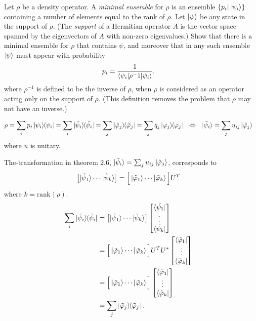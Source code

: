   Let $\rho$ be a density operator.  A \textit{minimal ensemble} for $\rho$ is an ensemble $\{p_i|\ket{\psi_i}\}$ containing a number of elements equal to the rank of $\rho$.  Let $\ket{\psi}$ be any state in the support of $\rho$.  (The \textit{support} of a Hermitian operator $A$ is the vector space spanned by the eigenvectors of $A$ with non-zero eigenvalues.)  Show that there is a minimal ensemble for $\rho$ that contains $\psi$, and moreover that in any such ensemble $\ket{\psi}$ must appear with probability $$p_i=\frac{1}{\braket{\psi_i|\rho^-1|\psi_i}},$$ where $\rho^{-1}$ is defined to be the inverse of $\rho$, when $\rho$ is considered as an operator acting only on the support of $\rho$.  (This definition removes the problem that $\rho$ may not have an inverse.)
\Soln
\begin{screen}
%
    \begin{align*}
        \rho = \sum_i p_i \ket{\psi_i}\hspace{-1mm} \bra{\psi_i}
            = \sum_i \ket{\tilde{\psi_i}}\hspace{-1mm} \bra{\tilde{\psi_i}}
            = \sum_j \ket{\tilde{\varphi}_j}\hspace{-1mm} \bra{\tilde{\varphi}_j}
            = \sum_j q_j \ket{\varphi_j}\hspace{-1mm} \bra{\varphi_j}
                ~~ \Leftrightarrow ~~
            \ket{\tilde{\psi}_i} = \sum_j u_{ij} \ket{\tilde{\varphi}_j}
    \end{align*}
    where $u$ is unitary.

	The-transformation in theorem 2.6, $\ket{\tilde{\psi}_i} = \sum_j u_{ij} \ket{\tilde{\varphi}_j}$, corresponds to
	\begin{align*}
	    \left[ \ket{\tilde{\psi}_1} \cdots \ket{\tilde{\psi}_k} \right] = \Big[ \ket{\tilde{\varphi}_1} \cdots \ket{\tilde{\varphi}_k} \Big] U^T
	\end{align*}
	where $k = \mathrm{rank} (\mathcal{\rho})$.
    \begin{align}
        \sum_i \ket{\tilde{\psi_i}}\hspace{-1mm} \bra{\tilde{\psi_i}} &= \left[ \ket{\tilde{\psi}_1} \cdots \ket{\tilde{\psi}_k} \right]
            \begin{bmatrix}
                \bra{\tilde{\psi_1}}\\
                \vdots\\
                \bra{\tilde{\psi_k}}
            \end{bmatrix}\\
        &= \Big[ \ket{\tilde{\varphi}_1} \cdots \ket{\tilde{\varphi}_k} \Big] U^T
            U^* \begin{bmatrix}
                    \bra{\tilde{\varphi}_1}\\
                    \vdots\\
                    \bra{\tilde{\varphi}_k}
            \end{bmatrix}\\
        &= \Big[ \ket{\tilde{\varphi}_1} \cdots \ket{\tilde{\varphi}_k} \Big]
             \begin{bmatrix}
                \bra{\tilde{\varphi}_1}\\
                \vdots\\
                \bra{\tilde{\varphi}_k}
            \end{bmatrix}\\
        &= \sum_j \ket{\tilde{\varphi}_j}\hspace{-1mm} \bra{\tilde{\varphi}_j}.
    \end{align}
\end{screen}

